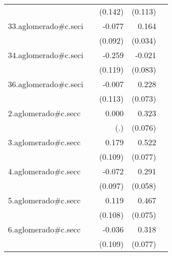 {\begin{longtable}{l*{4}{D{.}{.}{-1}}}
            &                     &     (0.142)         &     (0.113)         &                     \\
\addlinespace
33.aglomerado#c.seci&                     &      -0.077         &       0.164\sym{***}&                     \\
            &                     &     (0.092)         &     (0.034)         &                     \\
\addlinespace
34.aglomerado#c.seci&                     &      -0.259\sym{*}  &      -0.021         &                     \\
            &                     &     (0.119)         &     (0.083)         &                     \\
\addlinespace
36.aglomerado#c.seci&                     &      -0.007         &       0.228\sym{**} &                     \\
            &                     &     (0.113)         &     (0.073)         &                     \\
\addlinespace
2.aglomerado#c.secc&                     &       0.000         &       0.323\sym{***}&                     \\
            &                     &         (.)         &     (0.076)         &                     \\
\addlinespace
3.aglomerado#c.secc&                     &       0.179         &       0.522\sym{***}&                     \\
            &                     &     (0.109)         &     (0.077)         &                     \\
\addlinespace
4.aglomerado#c.secc&                     &      -0.072         &       0.291\sym{***}&                     \\
            &                     &     (0.097)         &     (0.058)         &                     \\
\addlinespace
5.aglomerado#c.secc&                     &       0.119         &       0.467\sym{***}&                     \\
            &                     &     (0.108)         &     (0.075)         &                     \\
\addlinespace
6.aglomerado#c.secc&                     &      -0.036         &       0.318\sym{***}&                     \\
            &                     &     (0.109)         &     (0.077)         &                     \\

\end{longtable}}
